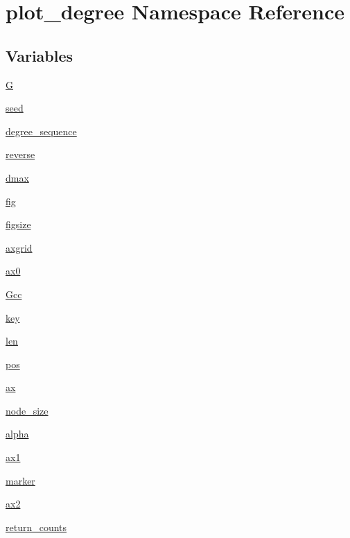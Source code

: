 \hypertarget{namespaceplot__degree}{}\section{plot\+\_\+degree Namespace Reference}
\label{namespaceplot__degree}
\subsection*{Variables}
\begin{DoxyCompactItemize}
\item 
\hyperlink{namespaceplot__degree_aa8be86cc0b6f117228f5a1ee5debc9d2}{G}
\item 
\hyperlink{namespaceplot__degree_af405a0aae9e039674e67a541cabfbb57}{seed}
\item 
\hyperlink{namespaceplot__degree_aad1bee33b5d06ca696d1cd1b295efab9}{degree\+\_\+sequence}
\item 
\hyperlink{namespaceplot__degree_ac037ec837159a16ede705a9af52f0bba}{reverse}
\item 
\hyperlink{namespaceplot__degree_ac311b8bf40073cc1f3932fdf7d5054b3}{dmax}
\item 
\hyperlink{namespaceplot__degree_ae3a15a3cc7ce890c4542a68820373e2c}{fig}
\item 
\hyperlink{namespaceplot__degree_acde2aee0e0330f3f1974597828f478b6}{figsize}
\item 
\hyperlink{namespaceplot__degree_a3ac1c6ca000b1d2aede6c371f6339675}{axgrid}
\item 
\hyperlink{namespaceplot__degree_ab037b710cebaf1a876ac90c6e822915e}{ax0}
\item 
\hyperlink{namespaceplot__degree_a14d6a862fa33758b8963cdc212583e95}{Gcc}
\item 
\hyperlink{namespaceplot__degree_adccbde37496bf810e7b4ed2b1f56a5a6}{key}
\item 
\hyperlink{namespaceplot__degree_a2e3fef9418efc8bb0609523d8348192e}{len}
\item 
\hyperlink{namespaceplot__degree_a682448e2c60a940b79bcc55e1b110463}{pos}
\item 
\hyperlink{namespaceplot__degree_ad11f3c7b28ef685575f950c58c8ca482}{ax}
\item 
\hyperlink{namespaceplot__degree_ae4c614f06983ebfd34b8331544d806dd}{node\+\_\+size}
\item 
\hyperlink{namespaceplot__degree_abeb30bee63ad8ad60600248f29b83f5b}{alpha}
\item 
\hyperlink{namespaceplot__degree_afc38aeeb3dc2553355c9ace8e7cc7cd5}{ax1}
\item 
\hyperlink{namespaceplot__degree_ac142dd9ad425a24b5be0f7628fbbd451}{marker}
\item 
\hyperlink{namespaceplot__degree_a0c3d941eba3581bb384a66d658f8135e}{ax2}
\item 
\hyperlink{namespaceplot__degree_a5b584ba0587a53ef3b7372d382c8c1bf}{return\+\_\+counts}
\end{DoxyCompactItemize}


